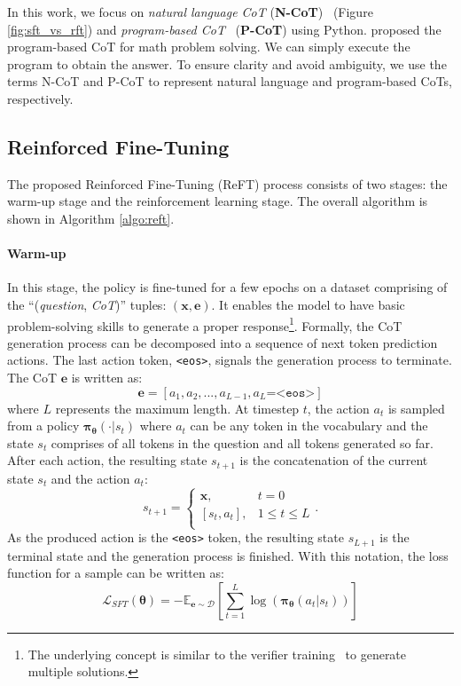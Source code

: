 In this work, we focus on \textit{natural language CoT} (\textbf{N-CoT})~\cite{wei2022chain} (Figure \ref{fig:sft_vs_rft}) and \textit{program-based CoT}~\cite{gao2023pal} (\textbf{P-CoT}) using Python. 
\citet{gao2023pal} proposed the program-based CoT for math problem solving. 
We can simply execute the program to obtain the answer. 
To ensure clarity and avoid ambiguity, we use the terms N-CoT and P-CoT to represent natural language and program-based CoTs, respectively.

\subsection{Reinforced Fine-Tuning}
\label{sec:reft}
The proposed Reinforced Fine-Tuning (ReFT) process consists of two stages: the warm-up stage and the reinforcement learning stage. 
The overall algorithm is shown in Algorithm \ref{algo:reft}.

    
    

\paragraph{Warm-up}
In this stage, the policy is fine-tuned for a few epochs on a dataset comprising of the ``(\textit{question}, \textit{CoT})'' tuples: $(\boldsymbol{x}, \boldsymbol{e})$.
It enables the model to have basic problem-solving skills to generate a proper response\footnote{The underlying concept is similar to the verifier training~\cite{cobbe2021training} to generate multiple solutions.}. 
Formally, the CoT generation process can be decomposed into a sequence of next token prediction actions. 
The last action token, \texttt{<eos>}, signals the generation process to terminate. 
The CoT $\boldsymbol{e}$ is written as:
$$
    \boldsymbol{e} = [a_1, a_2, ..., a_{L-1}, a_L\texttt{=<eos>}]
$$
where $L$ represents the maximum length. 
At timestep $t$, the action $a_t$ is sampled from a policy $\boldsymbol{\pi}_{\boldsymbol{\theta}}(\cdot|s_t)$ where $a_t$ can be any token in the vocabulary and the state $s_t$ comprises of all tokens in the question and all tokens generated so far. 
After each action, the resulting state $s_{t+1}$ is the concatenation of the current state $s_t$ and the action $a_t$:
$$
    s_{t+1} = 
        \begin{cases}
            \boldsymbol{x}, & t = 0 \\
            [s_t, a_t],     & 1 \leq t \leq L \\
        \end{cases}.
$$
As the produced action is the \texttt{<eos>} token, 
the resulting state $s_{L+1}$ is the terminal state and the generation process is finished.
With this notation, the loss function for a sample can be written as:
\begin{equation}
    \mathcal{L}_{SFT}(\boldsymbol{\theta})=-\mathbb{E}_{\boldsymbol{e} \sim \mathcal{D}}\left[\sum_{t=1}^{L}\log\left(\boldsymbol{\pi}_{\boldsymbol{\theta}}(a_t\vert s_t)\right)\right]
    \label{eq:sft-loss}
\end{equation}


